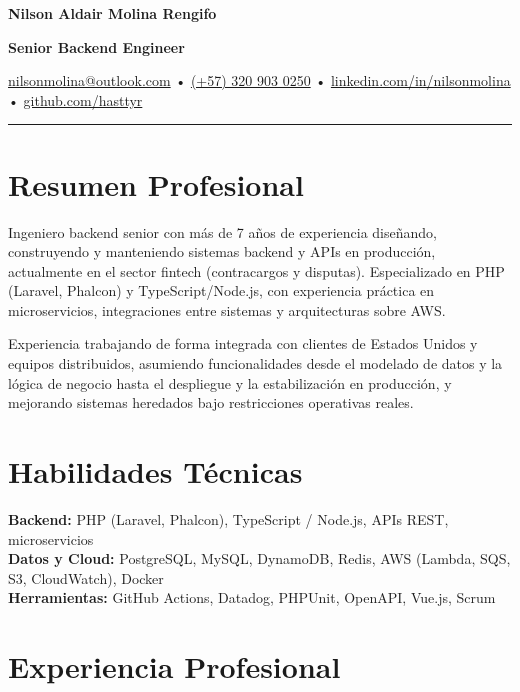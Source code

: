 \documentclass[9pt,letterpaper]{extarticle}
\begin{document}
	
	\begin{center}
		{\LARGE \textbf{Nilson Aldair Molina Rengifo}}
		
		\textbf{Senior Backend Engineer}

		\href{mailto:nilsonmolina@outlook.com}{nilsonmolina@outlook.com} •
		\href{https://wa.me/573209030250}{(+57) 320 903 0250} •
		\href{https://linkedin.com/in/nilsonmolina}{linkedin.com/in/nilsonmolina} •
		\href{https://github.com/hasttyr}{github.com/hasttyr}
	\end{center}

	\hrule

	\section*{Resumen Profesional}
		Ingeniero backend senior con más de 7 años de experiencia diseñando, construyendo y manteniendo sistemas backend y APIs en producción, actualmente en el sector fintech (contracargos y disputas). Especializado en PHP (Laravel, Phalcon) y TypeScript/Node.js, con experiencia práctica en microservicios, integraciones entre sistemas y arquitecturas sobre AWS.

		Experiencia trabajando de forma integrada con clientes de Estados Unidos y equipos distribuidos, asumiendo funcionalidades desde el modelado de datos y la lógica de negocio hasta el despliegue y la estabilización en producción, y mejorando sistemas heredados bajo restricciones operativas reales.

	\section*{Habilidades Técnicas}
		\textbf{Backend:} PHP (Laravel, Phalcon), TypeScript / Node.js, APIs REST, microservicios \\
		\textbf{Datos y Cloud:} PostgreSQL, MySQL, DynamoDB, Redis, AWS (Lambda, SQS, S3, CloudWatch), Docker \\
		\textbf{Herramientas:} GitHub Actions, Datadog, PHPUnit, OpenAPI, Vue.js, Scrum

	\section*{Experiencia Profesional}
	
\end{document}
